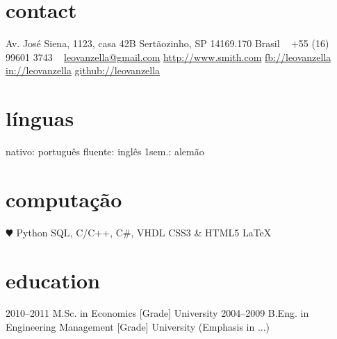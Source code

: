 \documentclass[]{cv-style}          %
\begin{document}
\lastupdated


\begin{aside}
%
\section{contact}
Av. José Siena, 1123, casa 42B
Sertãozinho, SP 14169.170
Brasil
~
+55 (16) 99601 3743
~
\href{mailto:leovanzella@gmail.com}{leovanzella@gmail.com}
\href{http://www.smith.com}{http://www.smith.com}
\href{http://facebook.com/leovanzella}{fb://leovanzella}
\href{http://linkedin.com/in/leovanzella/}{in://leovanzella}
\href{http://github.com/leovanzella/}{github://leovanzella}
%
\section{línguas}
nativo: português
fluente: inglês
1sem.: alemão
%
\section{computação}
{\color{red} $\varheartsuit$} Python
SQL, C/C++, C\#, VHDL
CSS3 \& HTML5
\LaTeX{}
%
\end{aside}


\section{education}

\begin{entrylist}
\entry
{2010--2011}
{M.Sc. {\normalfont in Economics [Grade]}}
{University}
{\vspace{-0.3cm}}
\entry
{2004--2009}
{B.Eng. {\normalfont in Engineering Management [Grade]}}
{University}
{(Emphasis in ...)}
\end{entrylist}
\end{document}

